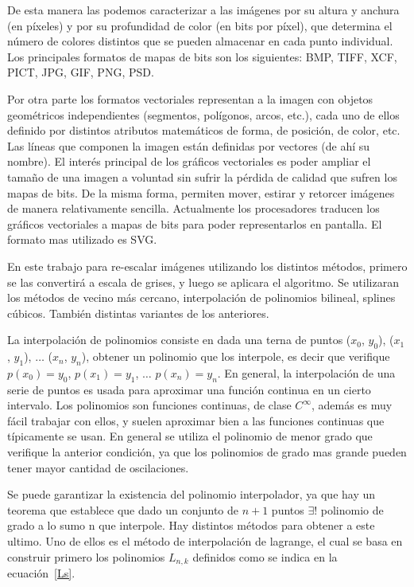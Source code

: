 \documentclass[a4paper]{article}
\newcounter{col}
\begin{document}
De esta manera las podemos caracterizar a las imágenes por su altura y anchura (en píxeles) y por su profundidad de color (en bits por píxel), que determina el número de colores distintos que se pueden almacenar en cada punto individual. Los principales formatos de mapas de bits son los siguientes: BMP, TIFF, XCF, PICT, JPG, GIF, PNG, PSD.

Por otra parte los formatos vectoriales representan a la imagen con objetos geométricos independientes (segmentos, polígonos, arcos, etc.), cada uno de ellos definido por distintos atributos matemáticos de forma, de posición, de color, etc. Las líneas que componen la imagen están definidas por vectores (de ahí su nombre). El interés principal de los gráficos vectoriales es poder ampliar el tamaño de una imagen a voluntad sin sufrir la pérdida de calidad que sufren los mapas de bits. De la misma forma, permiten mover, estirar y retorcer imágenes de manera relativamente sencilla. Actualmente los procesadores traducen los gráficos vectoriales a mapas de bits para poder representarlos en pantalla. El formato mas utilizado es SVG.

En este trabajo para re-escalar imágenes utilizando los distintos métodos, primero se las convertirá a escala de grises, y luego se aplicara el algoritmo. Se utilizaran los métodos de vecino más cercano, interpolación de polinomios bilineal, splines cúbicos. También distintas variantes de los anteriores.

La interpolación de polinomios consiste en dada una terna de puntos ($ x_{0} $, $ y_{0} $), ($ x_{1} $, $ y_{1} $), $ \ldots $ ($ x_{n} $, $ y_{n} $), obtener un polinomio que los interpole, es decir que verifique $ p(x_{0}) =  y_{0} $, $ p(x_{1}) =  y_{1} $, $ \ldots $ $ p(x_{n}) =  y_{n} $. En general, la interpolación de una serie de puntos es usada para aproximar una función continua en un cierto intervalo. Los polinomios son funciones continuas, de clase $ C^{\infty} $, además es muy fácil trabajar con ellos, y suelen aproximar bien a las funciones continuas que típicamente se usan. En general se utiliza el polinomio de menor grado que verifique la anterior condición, ya que los polinomios de grado mas grande pueden tener mayor cantidad de oscilaciones.

Se puede garantizar la existencia del polinomio interpolador, ya que hay un teorema que establece que dado un conjunto de $ n +1 $ puntos $ \exists! $ polinomio de grado a lo sumo n que interpole. Hay distintos métodos para obtener a este ultimo. Uno de ellos es el método de interpolación de lagrange, el cual se basa en construir primero los polinomios $ L_{n,k} $ definidos como se indica en la ecuación~\ref{Ls}.
\end{document}

